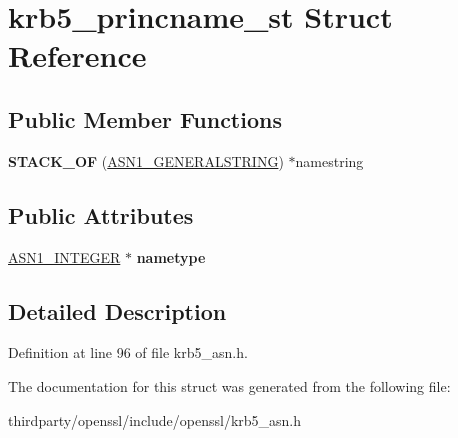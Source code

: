\hypertarget{structkrb5__princname__st}{}\section{krb5\+\_\+princname\+\_\+st Struct Reference}
\label{structkrb5__princname__st}
\subsection*{Public Member Functions}
\begin{DoxyCompactItemize}
\item 
\mbox{\label{structkrb5__princname__st_a8222c7dfd592bb047cd38b1e22ff2812}} 
{\bfseries S\+T\+A\+C\+K\+\_\+\+OF} (\hyperlink{structasn1__string__st}{A\+S\+N1\+\_\+\+G\+E\+N\+E\+R\+A\+L\+S\+T\+R\+I\+NG}) $\ast$namestring
\end{DoxyCompactItemize}
\subsection*{Public Attributes}
\begin{DoxyCompactItemize}
\item 
\mbox{\label{structkrb5__princname__st_a0cc37375579e858fd5956ec1d824a8c2}} 
\hyperlink{structasn1__string__st}{A\+S\+N1\+\_\+\+I\+N\+T\+E\+G\+ER} $\ast$ {\bfseries nametype}
\end{DoxyCompactItemize}


\subsection{Detailed Description}


Definition at line 96 of file krb5\+\_\+asn.\+h.



The documentation for this struct was generated from the following file\+:\begin{DoxyCompactItemize}
\item 
thirdparty/openssl/include/openssl/krb5\+\_\+asn.\+h\end{DoxyCompactItemize}

